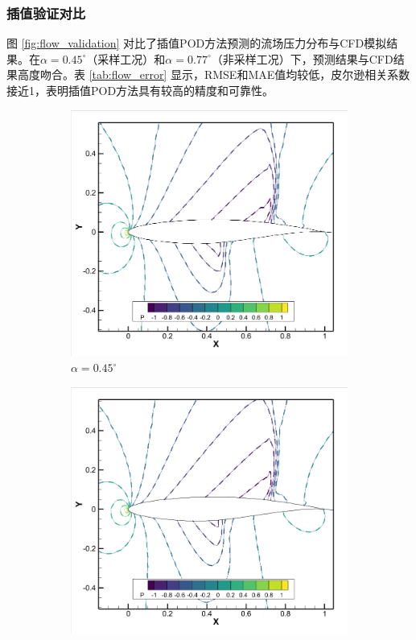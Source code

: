 \subsubsection{插值验证对比}

图 \ref{fig:flow_validation} 对比了插值POD方法预测的流场压力分布与CFD模拟结果。在$\alpha=0.45^\circ$（采样工况）和$\alpha=0.77^\circ$（非采样工况）下，预测结果与CFD结果高度吻合。表 \ref{tab:flow_error} 显示，RMSE和MAE值均较低，皮尔逊相关系数接近1，表明插值POD方法具有较高的精度和可靠性。

\begin{figure}[H]
    \centering
    \begin{subfigure}[b]{0.45\textwidth}
        \includegraphics[width=\textwidth]{0.45对比图.png}
        \caption{$\alpha=0.45^\circ$}
    \end{subfigure}
    \begin{subfigure}[b]{0.45\textwidth}
        \includegraphics[width=\textwidth]{0.77对比图.png}

\end{subfigure}
\end{figure}
